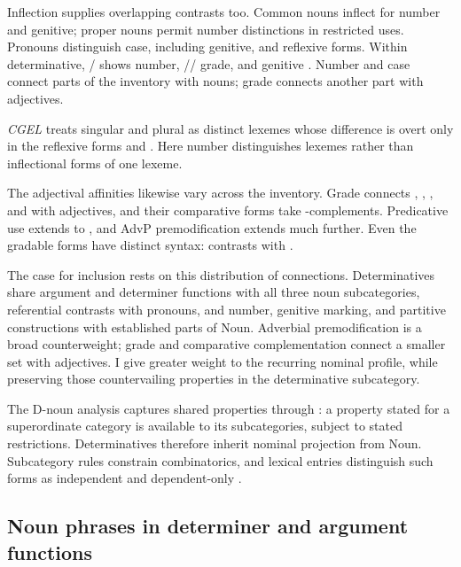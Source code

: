 \documentclass[12pt]{article}
\begin{document}
Inflection supplies overlapping contrasts too. Common nouns inflect for number and genitive; proper nouns permit number distinctions in restricted uses. Pronouns distinguish case, including genitive, and reflexive forms. Within determinative, / shows number, // grade, and  genitive \citep[373, 423--424, 426, 479--480, 521]{huddleston2002}. Number and case connect parts of the inventory with nouns; grade connects another part with adjectives.

\textit{CGEL} treats singular and plural  as distinct lexemes whose difference is overt only in the reflexive forms  and  \citep[486]{huddleston2002}. Here number distinguishes lexemes rather than inflectional forms of one lexeme.

The adjectival affinities likewise vary across the inventory. Grade connects , , , and  with adjectives, and their comparative forms take -complements. Predicative use extends to , and AdvP premodification extends much further. Even the gradable forms have distinct syntax:  contrasts with  \citep[392--396, 539--540]{huddleston2002}.

The case for inclusion rests on this distribution of connections. Determinatives share argument and determiner functions with all three noun subcategories, referential contrasts with pronouns, and number, genitive marking, and partitive constructions with established parts of Noun. Adverbial premodification is a broad counterweight; grade and comparative complementation connect a smaller set with adjectives. I give greater weight to the recurring nominal profile, while preserving those countervailing properties in the determinative subcategory.

The D-noun analysis captures shared properties through : a property stated for a superordinate category is available to its subcategories, subject to stated restrictions. Determinatives therefore inherit nominal projection from Noun. Subcategory rules constrain combinatorics, and lexical entries distinguish such forms as independent  and dependent-only .

\subsection{Noun phrases in determiner and argument functions}\label{sec:bridge}
\end{document}
